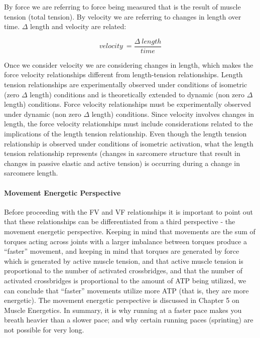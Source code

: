 By force we are referring to force being measured that is the result of muscle tension (total tension). By velocity we are referring to changes in length over time. $\Delta$ length and velocity are related: 

\begin{equation} \label{eq_velocity}
velocity \ = \frac{\Delta \ length}{time}
\end{equation}

 Once we consider velocity we are considering changes in length, which makes the force velocity relationships different from length-tension relationships. Length tension relationships are experimentally observed under conditions of isometric (zero $\Delta$ length) conditions and is theoretically extended to dynamic (non zero $\Delta$ length) conditions. Force velocity relationships must be experimentally observed under dynamic (non zero $\Delta$ length) conditions. Since velocity involves changes in length, the force velocity relationships must include considerations related to the implications of the length tension relationship. Even though the length tension relationship is observed under conditions of isometric activation, what the length tension relationship represents (changes in sarcomere structure that result in changes in passive elastic and active tension) is occurring during a change in sarcomere length.

\paragraph{Movement Energetic Perspective}
Before proceeding with the FV and VF relationships it is important to point out that these relationships can be differentiated from a third perspective - the movement energetic perspective. Keeping in mind that movements are the sum of torques acting across joints with a larger imbalance between torques produce a “faster” movement, and keeping in mind that torques are generated by force which is generated by active muscle tension, and that active muscle tension is proportional to the number of activated crossbridges, and that the number of activated crossbridges is proportional to the amount of ATP being utilized, we can conclude that “faster” movements utilize more ATP (that is, they are more energetic). The movement energetic perspective is discussed in Chapter 5 on Muscle Energetics. In summary, it is why running at a faster pace makes you breath heavier than a slower pace; and why certain running paces (sprinting) are not possible for very long. \footnotemark{} 

